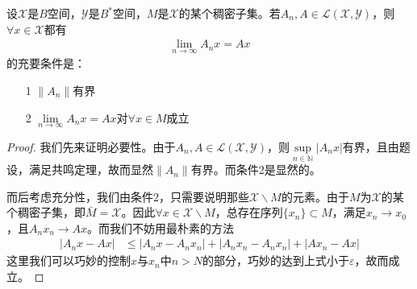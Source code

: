	\begin{theorem}
		设$\mathscr{X}$是$B$空间，$\mathscr{Y}$是$B^*$空间，$M$是$\mathscr{X}$的某个稠密子集。若$A_n,A\in\mathscr{L}(\mathscr{X},\mathscr{Y})$，则$\forall x\in\mathscr{X}$都有
		\begin{align*}
			\lim\limits_{n\to\infty} A_n x = Ax
		\end{align*}
		的充要条件是：
		\begin{itemize}
			\item[1] $\|A_n\|$有界
			\item[2] $\lim\limits_{n\to\infty} A_n x = Ax$对$\forall x\in M$成立
		\end{itemize}
	\end{theorem}
	\begin{proof}
		我们先来证明必要性。由于$A_n, A\in\mathscr{L}(\mathscr{X},\mathscr{Y})$，则$\sup\limits_{n\in \mathbb{N}} |A_n x|$有界，且由题设，满足共鸣定理，故而显然$\|A_n\|$有界。而条件2是显然的。
		
		而后考虑充分性，我们由条件2，只需要说明那些$\mathscr{X}\backslash M$的元素。由于$M$为$\mathscr{X}$的某个稠密子集，即$\bar{M} = \mathscr{X}$。因此$\forall x\in \mathscr{X}\backslash M$，总存在序列$\{x_n\}\subset M$，满足$x_n\to x_0$，且$A_n x_n \to Ax$。而我们不妨用最朴素的方法
		\begin{align*}
			|A_n x - Ax| & \leqslant |A_n x - A_n x_n| + |A_n x_n - A_n x_n| + |A x_n - Ax|
		\end{align*}
		这里我们可以巧妙的控制$x$与$x_n$中$n>N$的部分，巧妙的达到上式小于$\varepsilon$，故而成立。
	\end{proof}
	
